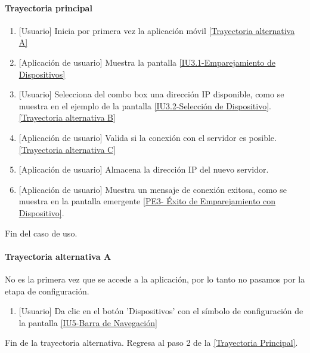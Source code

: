\paragraph{Trayectoria principal} \label{SUB-U-CU1.4:TP}
	\begin{enumerate}
		\item {[Usuario]} Inicia por primera vez la aplicación móvil \hyperref[SUB-U-CU1.4:TA]{[Trayectoria alternativa A]} 
		\item {[Aplicación de usuario]} Muestra la pantalla \hyperref[fig:Emparejamiento Dispositivos]{[IU3.1-Emparejamiento de Dispositivos]}
		\item  {[Usuario]} Selecciona del combo box una dirección IP disponible, como se muestra en el ejemplo de la pantalla \hyperref[fig:Seleccion de Disposotivo]{[IU3.2-Selección de Dispositivo]}. \hyperref[SUB-U-CU1.4:TB]{[Trayectoria alternativa B]}
		\item {[Aplicación de usuario]} Valida si la conexión con el servidor es posible. \hyperref[SUB-U-CU1.4:TC]{[Trayectoria alternativa C]}
		\item {[Aplicación de usuario]} Almacena la dirección IP del nuevo servidor.
		\item {[Aplicación de usuario]} Muestra un mensaje de conexión exitosa, como se muestra en la pantalla emergente \hyperref[fig:Exito Emparejamiento]{[PE3- Éxito de Emparejamiento con Dispositivo]}.
	\end{enumerate}
	Fin del caso de uso.

\paragraph{Trayectoria alternativa A} \label{SUB-U-CU1.4:TA}
	No es la primera vez que se accede a la aplicación, por lo tanto no pasamos por la etapa de configuración.
	\begin{enumerate}[label=A\arabic*.]
		\item {[Usuario]} Da clic en el botón 'Dispositivos' con el símbolo de configuración de la pantalla \hyperref[fig:Barra de navegacion]{[IU5-Barra de Navegación]}
	\end{enumerate}
	Fin de la trayectoria alternativa. Regresa al paso 2 de la \hyperref[SUB-U-CU1.4:TP]{[Trayectoria Principal]}.
	
